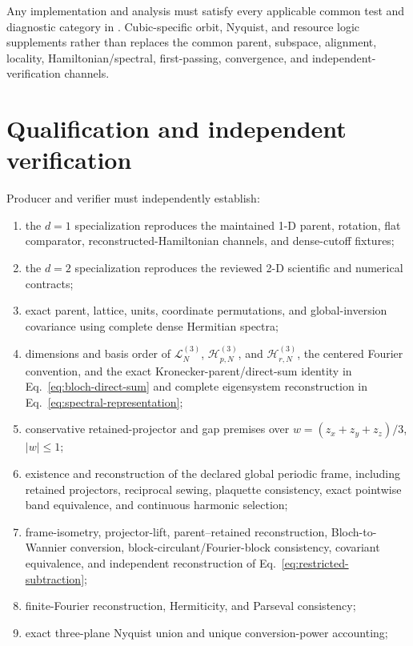 \documentclass[11pt]{article}
\begin{document}
Any implementation and analysis must satisfy every applicable common test and
diagnostic category in
.
Cubic-specific orbit, Nyquist, and resource logic supplements rather than replaces the
common parent, subspace, alignment, locality, Hamiltonian/spectral, first-passing,
convergence, and independent-verification channels.

\section{Qualification and independent verification}

Producer and verifier must independently establish:

\begin{enumerate}[label=\arabic*.]
 \item the $d=1$ specialization reproduces the maintained 1-D parent, rotation, flat
       comparator, reconstructed-Hamiltonian channels, and dense-cutoff fixtures;
 \item the $d=2$ specialization reproduces the reviewed 2-D scientific and numerical
       contracts;
 \item exact parent, lattice, units, coordinate permutations, and global-inversion
       covariance using complete dense Hermitian spectra;
 \item dimensions and basis order of $\mathcal L_N^{(3)}$, $\mathcal H_{p,N}^{(3)}$,
       and $\mathcal H_{r,N}^{(3)}$, the centered Fourier convention, and the exact
       Kronecker-parent/direct-sum identity in Eq.~\eqref{eq:bloch-direct-sum} and
       complete eigensystem reconstruction in Eq.~\eqref{eq:spectral-representation};
 \item conservative retained-projector and gap premises over
       $w=(z_x+z_y+z_z)/3$, $|w|\le1$;
 \item existence and reconstruction of the declared global periodic frame, including
       retained projectors, reciprocal sewing, plaquette consistency, exact pointwise
       band equivalence, and continuous harmonic selection;
 \item frame-isometry, projector-lift, parent--retained reconstruction, Bloch-to-Wannier
       conversion, block-circulant/Fourier-block consistency, covariant equivalence, and
       independent reconstruction of Eq.~\eqref{eq:restricted-subtraction};
 \item finite-Fourier reconstruction, Hermiticity, and Parseval consistency;
 \item exact three-plane Nyquist union and unique conversion-power accounting;

\end{enumerate}
\end{document}
